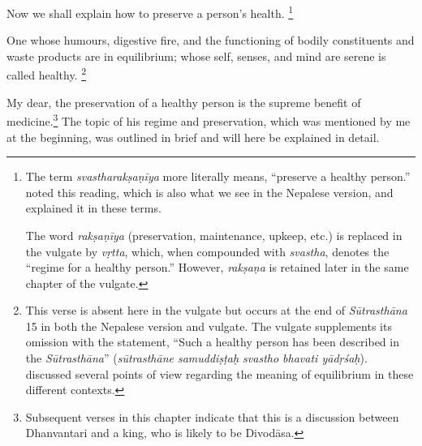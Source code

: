 \begin{translation}    
  
\item [1] 
Now we shall explain how to preserve a person's health.%
	\footnote{The term \emph{svastharakṣaṇīya} more literally means, ``preserve a healthy person.''  noted this reading, which is also what we see in the Nepalese version, and explained it in these terms.
    
    The word \emph{rakṣaṇīya} (preservation, maintenance, upkeep, etc.) is replaced in the vulgate \citep[808]{vulgate} by \emph{vṛtta}, which, when compounded with \emph{svastha}, denotes the “regime for a healthy person.” However, \emph{rakṣaṇa} is retained later in the same chapter of the vulgate.} 

\item [2] 
One whose humours, digestive fire, and the functioning of bodily constituents and waste products are in equilibrium; whose self, senses, and mind are serene is called healthy.%
    \footnote{This verse is absent here in the vulgate but occurs at the end of \emph{Sūtrasthāna} 15 in both the Nepalese version and vulgate. The vulgate \citep[808]{vulgate} supplements its omission with the statement, ``Such a healthy person has been described in the \emph{Sūtrasthāna}'' (\emph{sūtrasthāne samuddiṣṭaḥ svastho bhavati yādṛśaḥ}).  discussed several points of view regarding the meaning of equilibrium in these different contexts.}

\item [3] 
My dear, the preservation of a healthy person is the supreme benefit of medicine.\footnote{%
    Subsequent verses in this chapter indicate that this is a discussion between Dhanvantari and a king, who is likely to be Divodāsa.} %
The topic of his regime and preservation, which was mentioned by me at the beginning, was outlined in brief and will here be explained in detail.


\end{translation}
